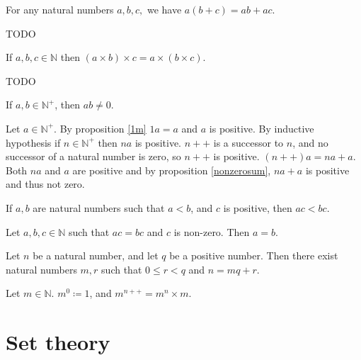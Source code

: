 \documentclass{article}
\begin{document}
\begin{proposition}
	For any natural numbers \(a,b,c,\) we have \(a(b+c)=ab+ac\).
\end{proposition}
\begin{IEEEproof}
	TODO
\end{IEEEproof}
\begin{proposition}
	If \(a,b,c\in\mathbb{N}\) then \((a\times b)\times c=a\times(b\times c)\).
\end{proposition}
\begin{IEEEproof}
	TODO
\end{IEEEproof}
\begin{proposition}
	\label{posinatmult}
	If \(a,b\in\mathbb{N}^+\), then \(ab\neq 0\).
\end{proposition}
	\begin{IEEEproof}
		Let \(a\in\mathbb{N}^+\). By proposition \ref{1m} \(1a=a\) and \(a\) is positive. By inductive hypothesis if \(n\in\mathbb{N}^+\) then \(na\) is positive. \(n++\) is a successor to \(n\), and no successor of a natural number is zero, so \(n++\) is positive. \((n++)a=na+a\). Both \(na\) and \(a\) are positive and by proposition \ref{nonzerosum}, \(na+a\) is positive and thus not zero.
	\end{IEEEproof}
\begin{proposition}
	If \(a,b\) are natural numbers such that \(a<b\), and \(c\) is positive, then \(ac<bc\).
\end{proposition}
\begin{corollary}
	Let \(a,b,c\in\mathbb{N}\) such that \(ac=bc\) and \(c\) is non-zero. Then \(a=b\).
\end{corollary}
\begin{proposition}
	Let \(n\) be a natural number, and let \(q\) be a positive number. Then there exist natural numbers \(m,r\) such that \(0\leq r<q\) and \(n=mq+r\).
\end{proposition}
\begin{definition}
	Let \(m\in\mathbb{N}\). \(m^0\coloneq 1\), and \(m^{n++}=m^n\times m\).
\end{definition}
\section{Set theory}
\end{document}
